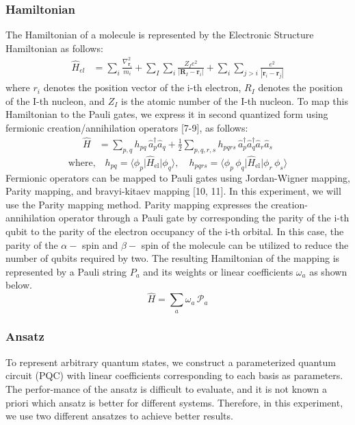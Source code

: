 \documentclass[pdflatex,sn-mathphys-num]{sn-jnl}%
\theoremstyle{thmstyleone}%
\theoremstyle{thmstyletwo}%
\theoremstyle{thmstylethree}%
\begin{document}
\subsubsection{Hamiltonian}\label{subsec2.2.1}
The Hamiltonian of a molecule is represented by the Electronic Structure Hamiltonian as follows:
\begin{align}
\hat{H}_{el} 
&= \sum_{i} \frac{\nabla_{\mathbf{r}_i}^2}{m_i}
+ \sum_{I} \sum_{i} \frac{Z_I e^2}{\left| \mathbf{R}_I - \mathbf{r}_i \right|}
+ \sum_{i} \sum_{j>i} \frac{e^2}{\left| \mathbf{r}_i - \mathbf{r}_j \right|}
\end{align}
where \(r_i\) denotes the position vector of the i-th electron, 
\(R_I\) denotes the position of the I-th nucleon, and \(Z_I\) is the atomic number of the I-th nucleon. 
To map this Hamiltonian to the Pauli gates, we express it in second quantized form using fermionic creation/annihilation operators [7-9], as follows:
\begin{align}
\hat{H} 
&= \sum_{p,q} h_{pq} \, \hat{a}_p^{\dagger} \hat{a}_q
+ \frac{1}{2} \sum_{p,q,r,s} h_{pqrs} \, \hat{a}_p^{\dagger} \hat{a}_q^{\dagger} \hat{a}_r \hat{a}_s
\end{align}
\begin{equation*}
\text{where,} \quad 
h_{pq} = \langle \phi_p \vert \hat{H}_{\mathrm{el}} \vert \phi_q \rangle, \quad
h_{pqrs} = \langle \phi_p \, \phi_q \vert \hat{H}_{\mathrm{el}} \vert \phi_r \, \phi_s \rangle
\end{equation*}
Fermionic operators can be mapped to Pauli gates using Jordan-Wigner mapping, Parity mapping, and bravyi-kitaev mapping [10, 11]. 
In this experiment, we will use the Parity mapping method. 
Parity mapping expresses the creation-annihilation operator through a Pauli gate by corresponding the parity of the i-th qubit to the parity of the electron occupancy of the i-th orbital. 
In this case, the parity of the \(\alpha-\) spin and \(\beta-\) spin of the molecule can be utilized to reduce the number of qubits required by two. 
The resulting Hamiltonian of the mapping is represented by a Pauli string \(P_a\) and its weights or linear coefficients \(\omega_a\) as shown below.
\begin{equation}
\hat{H} = \sum_{a} \omega_{a} \, \mathcal{P}_{a}
\end{equation}

\subsubsection{Ansatz}\label{subsec2.2.2}
To represent arbitrary quantum states, we construct a parameterized quantum circuit (PQC) with linear coefficients corresponding to each basis as parameters. The perfor-mance of the ansatz is difficult to evaluate, and it is not known a priori which ansatz is better for different systems. Therefore, in this experiment, we use two different ansatzes to achieve better results.
\end{document}
